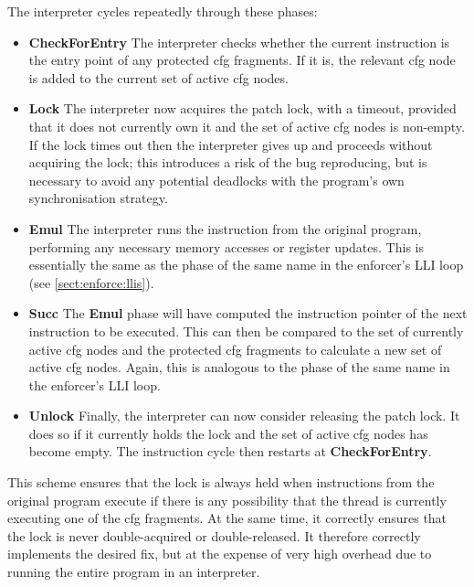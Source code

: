 The interpreter cycles repeatedly through these phases:
\begin{itemize}
\item \textbf{CheckForEntry} The interpreter checks whether the
  current instruction is the entry point of any protected \gls{cfg}
  fragments.  If it is, the relevant \gls{cfg} node is added to the
  current set of active \gls{cfg} nodes.

\item \textbf{Lock} The interpreter now acquires the patch lock, with
  a timeout, provided that it does not currently own it and the set of
  active \gls{cfg} nodes is non-empty.  If the lock times out then the
  interpreter gives up and proceeds without acquiring the lock; this
  introduces a risk of the bug reproducing, but is necessary to avoid
  any potential deadlocks with the program's own synchronisation
  strategy.

\item \textbf{Emul} The interpreter runs the instruction from the
  original program, performing any necessary memory accesses or
  register updates.  This is essentially the same as the phase of the
  same name in the enforcer's LLI loop (see \autoref{sect:enforce:llis}).

\item \textbf{Succ} The \textbf{Emul} phase will have computed the
  instruction pointer of the next instruction to be executed.  This
  can then be compared to the set of currently active \gls{cfg} nodes
  and the protected \gls{cfg} fragments to calculate a new set of
  active \gls{cfg} nodes.  Again, this is analogous to the phase of
  the same name in the enforcer's LLI loop.

\item \textbf{Unlock} Finally, the interpreter can now consider
  releasing the patch lock.  It does so if it currently holds the lock
  and the set of active \gls{cfg} nodes has become empty.  The instruction
  cycle then restarts at \textbf{CheckForEntry}.
\end{itemize}
This scheme ensures that the lock is always held when instructions
from the original program execute if there is any possibility that the
thread is currently executing one of the \gls{cfg} fragments.  At the
same time, it correctly ensures that the lock is never double-acquired
or double-released.  It therefore correctly implements the desired
fix, but at the expense of very high overhead due to running the
entire program in an interpreter.

